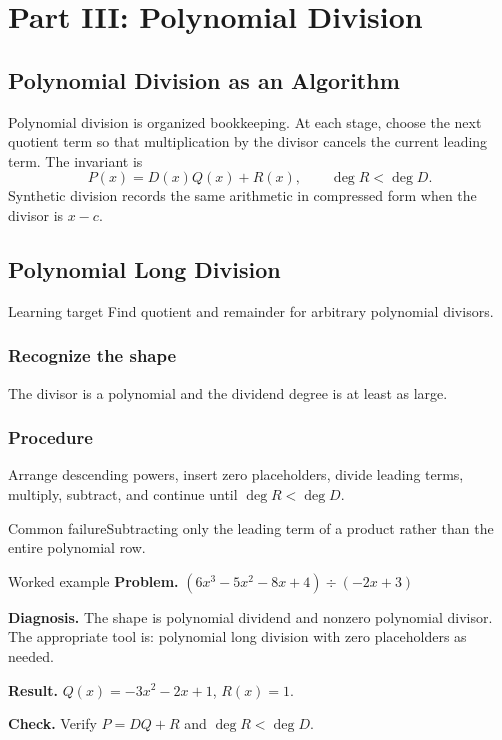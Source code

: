 \documentclass[11pt,oneside]{book}
\begin{document}
\part{Part III: Polynomial Division}
\chapter*{Polynomial Division as an Algorithm}
Polynomial division is organized bookkeeping. At each stage, choose the next quotient term so that multiplication by the divisor cancels the current leading term. The invariant is
\[
P(x)=D(x)Q(x)+R(x),\qquad \deg R<\deg D.
\]
Synthetic division records the same arithmetic in compressed form when the divisor is $x-c$.

\chapter{Polynomial Long Division}
\begin{rulebox}{Learning target}
Find quotient and remainder for arbitrary polynomial divisors.
\end{rulebox}
\section{Recognize the shape}
The divisor is a polynomial and the dividend degree is at least as large.
\section{Procedure}
Arrange descending powers, insert zero placeholders, divide leading terms, multiply, subtract, and continue until $\deg R<\deg D$.

\begin{warningbox}{Common failure}Subtracting only the leading term of a product rather than the entire polynomial row.\end{warningbox}
\begin{examplebox}{Worked example}
\textbf{Problem.} $\displaystyle (6 x^{3} - 5 x^{2} - 8 x + 4)\div(- 2 x + 3)$

\textbf{Diagnosis.} The shape is polynomial dividend and nonzero polynomial divisor. The appropriate tool is: polynomial long division with zero placeholders as needed.

\textbf{Result.} $Q(x)=- 3 x^{2} - 2 x + 1$, $R(x)=1$.

\textbf{Check.} Verify $P=DQ+R$ and $\deg R<\deg D$.
\end{examplebox}
\end{document}
